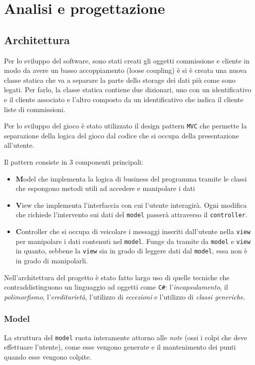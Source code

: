 \section{Analisi e progettazione}
\subsection{Architettura}
Per lo sviluppo del software, sono stati creati gli oggetti commissione e cliente in modo da avere un basso accoppiamento (loose coupling) 
è si è creata una nuova classe statica che va a separare la parte dello storage dei dati più come sono legati. 
Per farlo, la classe statica contiene due dizionari, uno con un identificativo e il cliente associato e l'altro composto da un identificativo 
che indica il cliente liste di commissioni.


Per lo sviluppo del gioco è stato utilizzato il design pattern \texttt{MVC} che permette la separazione della logica del gioco dal codice che si occupa della presentazione all'utente.

Il pattern consiste in 3 componenti principali:
\begin{itemize}
    \item \textbf{M}odel che implementa la logica di business del programma tramite le classi che espongono metodi utili ad accedere e manipolare i dati

    \item \textbf{V}iew che implementa l'interfaccia con cui l'utente interagirà. Ogni modifica che richiede l'intervento sui dati del \texttt{model} passerà attraverso il \texttt{controller}.

    \item \textbf{C}ontroller che si occupa di veicolare i messaggi inseriti dall'utente nella \texttt{view} per manipolare i dati contenuti nel \texttt{model}.
          Funge da tramite da \texttt{model} e \texttt{view} in quanto, sebbene la \texttt{view} sia in grado di leggere dati dal \texttt{model}, essa non è in grado di manipolarli.
\end{itemize}

\vspace{0.5cm}
Nell'architettura del progetto è stato fatto largo uso di quelle tecniche che contraddistinguono un linguaggio ad oggetti come \texttt{C\#}: l'\emph{incapsulamento}, il \emph{polimorfismo}, l'\emph{ereditarietà}, l'utilizzo di \emph{eccezioni} e l'utilizzo di \emph{classi generiche}.

\subsubsection{Model}
La struttura del \texttt{model} ruota interamente attorno alle \emph{note} (ossi i colpi che deve effettuare l'utente), come esse vengono generate e il mantenimento dei punti quando esse vengono colpite.

